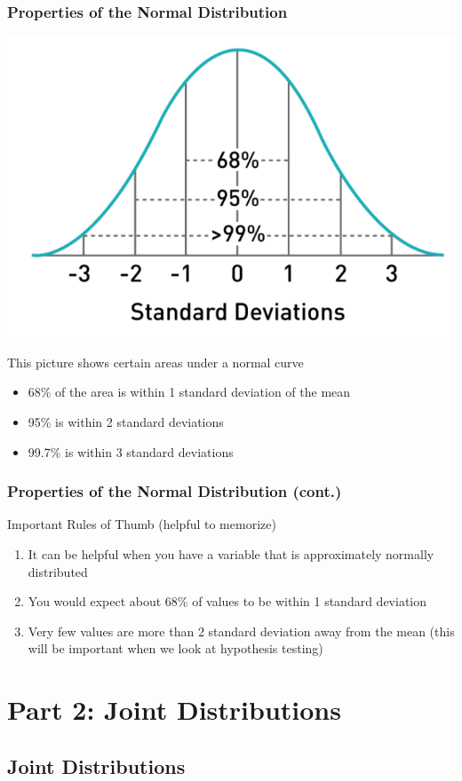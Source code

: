 \documentclass[12pt, block=fill]{beamer}
\begin{document}
\begin{frame}
  \frametitle{Properties of the Normal Distribution}
  \begin{center}
      \includegraphics[width=0.5\linewidth]{figures/properties_normal_distribution.png}
  \end{center}
  This picture shows certain areas under a normal curve
  \begin{itemize}
      \item 68\% of the area is within 1 standard deviation of the mean
      \item 95\% is within 2 standard deviations
      \item 99.7\% is within 3 standard deviations
  \end{itemize}
\end{frame}

\begin{frame}
  \frametitle{Properties of the Normal Distribution (cont.)}
  \begin{exampleblock}{Important Rules of Thumb (helpful to memorize)}
    \begin{enumerate}
        \item It can be helpful when you have a variable that is approximately normally distributed
        \item You would expect about 68\% of values to be within 1 standard deviation
        \item Very few values are more than 2 standard deviation away from the mean (this will be important when we look at hypothesis testing)
    \end{enumerate}
  \end{exampleblock}
    
\end{frame}

\section{Part 2: Joint Distributions} 

\subsection{Joint Distributions}
\end{document}
